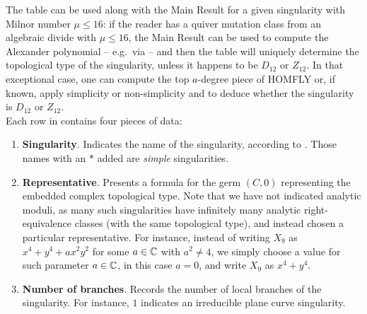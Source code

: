 \noindent The table can be used along with the Main Result for a given singularity with Milnor number $\mu\leq 16$: if the reader has a quiver mutation class from an algebraic divide with $\mu\leq 16$, the Main Result can be used to compute the Alexander polynomial -- e.g.~via  -- and then the table will uniquely determine the topological type of the singularity, unless it happens to be $D_{12}$ or $Z_{12}$. In that exceptional case, one can compute the top $a$-degree piece of HOMFLY or, if known, apply simplicity or non-simplicity and \cite[Theorem 18.3]{FPST} to deduce whether the singularity is $D_{12}$ or $Z_{12}$.\\

Each row in  contains four pieces of data:

\begin{enumerate}
    \item {\bf Singularity}. Indicates the name of the singularity, according to \cite{Arnold1976}. Those names with an $\ast$ added are {\it simple} singularities.\\

    \item {\bf Representative}. Presents a formula for the germ $(C,0)$ representing the embedded complex topological type. Note that we have not indicated analytic moduli, as many such singularities have infinitely many analytic right-equivalence classes (with the same topological type), and instead chosen a particular representative. For instance, instead of writing $X_9$ as $x^4+y^4+ax^2y^2$ for some $a\in\mathbb C$ with $a^2\neq 4$, we simply choose a value for such parameter $a\in\mathbb C$, in this case $a=0$, and write $X_9$ as $x^4+y^4$.\\

    \item {\bf Number of branches}. Records the number of local branches of the singularity. For instance, $1$ indicates an irreducible plane curve singularity.\\


\end{enumerate}
